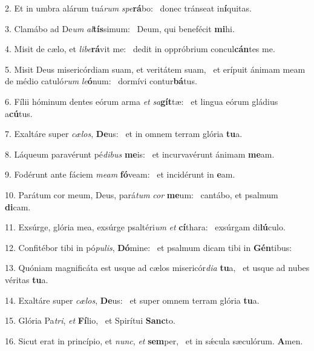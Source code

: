 2. Et in umbra alárum tuá\textit{rum} \textit{spe}\textbf{rá}bo: \ast\  donec tránseat in\textbf{í}quitas.\

3. Clamábo ad De\textit{um} \textit{al}\textbf{tís}simum: \ast\  Deum, qui benefécit \textbf{mi}hi.\

4. Misit de cælo, et \textit{li}\textit{be}\textbf{rá}vit me: \ast\  dedit in oppróbrium concul\textbf{cán}tes me.\

5. Misit Deus misericórdiam suam, et veritátem suam, \dag\  et erípuit ánimam meam de médio catuló\textit{rum} \textit{le}\textbf{ó}num: \ast\  dormívi contur\textbf{bá}tus.\

6. Fílii hóminum dentes eórum arma \textit{et} \textit{sa}\textbf{gít}tæ: \ast\  et lingua eórum gládius a\textbf{cú}tus.\

7. Exaltáre super \textit{cæ}\textit{los}, \textbf{De}us: \ast\  et in omnem terram glória \textbf{tu}a.\

8. Láqueum paravérunt pé\textit{di}\textit{bus} \textbf{me}is: \ast\  et incurvavérunt ánimam \textbf{me}am.\

9. Fodérunt ante fáciem \textit{me}\textit{am} \textbf{fó}veam: \ast\  et incidérunt in \textbf{e}am.\

10. Parátum cor meum, Deus, pará\textit{tum} \textit{cor} \textbf{me}um: \ast\  cantábo, et psalmum \textbf{di}cam.\

11. Exsúrge, glória mea, exsúrge psaltéri\textit{um} \textit{et} \textbf{cí}thara: \ast\  exsúrgam di\textbf{lú}culo.\

12. Confitébor tibi in pó\textit{pu}\textit{lis}, \textbf{Dó}mine: \ast\  et psalmum dicam tibi in \textbf{Gén}tibus:\

13. Quóniam magnificáta est usque ad cælos misericór\textit{di}\textit{a} \textbf{tu}a, \ast\  et usque ad nubes véritas \textbf{tu}a.\

14. Exaltáre super \textit{cæ}\textit{los}, \textbf{De}us: \ast\  et super omnem terram glória \textbf{tu}a.\

15. Glória Pa\textit{tri}, \textit{et} \textbf{Fí}lio, \ast\  et Spirítui \textbf{Sanc}to.\

16. Sicut erat in princípio, et \textit{nunc}, \textit{et} \textbf{sem}per, \ast\  et in sǽcula sæculórum. \textbf{A}men.\


